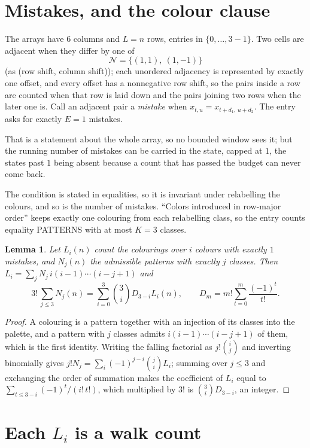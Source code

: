 \documentclass[11pt,a4paper]{article}
\theoremstyle{plain}
\newtheorem{lemma}[theorem]{Lemma}
\theoremstyle{definition}
\begin{document}
\section{Mistakes, and the colour clause}

The arrays have $6$ columns and $L=n$ rows, entries in $\{0,\dots,3-1\}$.
Two cells are adjacent when they differ by one of
\[
\mathcal N=\{(1,1),\ (1,-1)\}
\]
(as (row shift, column shift)); each unordered adjacency is represented by exactly one
offset, and every offset has a nonnegative row shift, so the pairs inside a row are
counted when that row is laid down and the pairs joining two rows when the later one
is. Call an adjacent pair a \emph{mistake} when $x_{t,u}=x_{t+d_1,\,u+d_2}$. The entry asks for exactly
$E=1$ mistakes.

That is a statement about the whole array, so no bounded window sees it; but the running
number of mistakes can be carried in the state, capped at $1$, the states past $1$ being
absent because a count that has passed the budget can never come back.

The condition is stated in equalities, so it is invariant under relabelling the colours, and
so is the number of mistakes. ``Colors introduced in row-major order'' keeps exactly one
colouring from each relabelling class, so the entry counts equality PATTERNS with at most
$K=3$ classes.

\begin{lemma}\label{lem:inv}
Let $L_i(n)$ count the colourings over $i$ colours with exactly $1$ mistakes, and $N_j(n)$
the admissible patterns with exactly $j$ classes. Then
$L_i=\sum_j N_j\,i(i-1)\cdots(i-j+1)$ and
\[
3!\,\sum_{j\le3}N_j(n)=\sum_{i=0}^{3}\binom{3}{i}D_{3-i}L_i(n),
\qquad D_m=m!\sum_{t=0}^{m}\frac{(-1)^t}{t!} .
\]
\end{lemma}

\begin{proof}
A colouring is a pattern together with an injection of its classes into the palette, and a
pattern with $j$ classes admits $i(i-1)\cdots(i-j+1)$ of them, which is the first identity.
Writing the falling factorial as $j!\binom{i}{j}$ and inverting binomially gives
$j!N_j=\sum_i(-1)^{j-i}\binom{j}{i}L_i$; summing over $j\le3$ and exchanging the order
of summation makes the coefficient of $L_i$ equal to $\sum_{t\le3-i}(-1)^t/(i!\,t!)$,
which multiplied by $3!$ is $\binom{3}{i}D_{3-i}$, an integer.
\end{proof}

\section{Each $L_i$ is a walk count}
\end{document}

